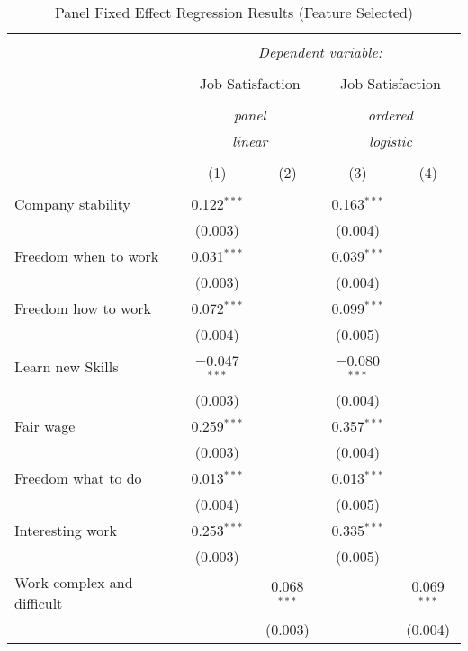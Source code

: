 
\begin{table}[!htbp] \centering 
  \caption{Panel Fixed Effect Regression Results (Feature Selected)} 
  \label{} 
\begin{tabular}{@{\extracolsep{3pt}}lcccc} 
\\[-1.8ex]\hline 
\hline \\[-1.8ex] 
 & \multicolumn{4}{c}{\textit{Dependent variable:}} \\ 
\cline{2-5} 
\\[-1.8ex] & \multicolumn{2}{c}{Job Satisfaction} & \multicolumn{2}{c}{Job Satisfaction} \\ 
\\[-1.8ex] & \multicolumn{2}{c}{\textit{panel}} & \multicolumn{2}{c}{\textit{ordered}} \\ 
 & \multicolumn{2}{c}{\textit{linear}} & \multicolumn{2}{c}{\textit{logistic}} \\ 
\\[-1.8ex] & (1) & (2) & (3) & (4)\\ 
\hline \\[-1.8ex] 
 Company stability & 0.122$^{***}$ &  & 0.163$^{***}$ &  \\ 
  & (0.003) &  & (0.004) &  \\ 
  Freedom when to work & 0.031$^{***}$ &  & 0.039$^{***}$ &  \\ 
  & (0.003) &  & (0.004) &  \\ 
  Freedom how to work & 0.072$^{***}$ &  & 0.099$^{***}$ &  \\ 
  & (0.004) &  & (0.005) &  \\ 
  Learn new Skills & $-$0.047$^{***}$ &  & $-$0.080$^{***}$ &  \\ 
  & (0.003) &  & (0.004) &  \\ 
  Fair wage & 0.259$^{***}$ &  & 0.357$^{***}$ &  \\ 
  & (0.003) &  & (0.004) &  \\ 
  Freedom what to do & 0.013$^{***}$ &  & 0.013$^{***}$ &  \\ 
  & (0.004) &  & (0.005) &  \\ 
  Interesting work & 0.253$^{***}$ &  & 0.335$^{***}$ &  \\ 
  & (0.003) &  & (0.005) &  \\ 
  Work complex and difficult &  & 0.068$^{***}$ &  & 0.069$^{***}$ \\ 
  &  & (0.003) &  & (0.004) \\ 

\end{tabular}
\end{table}
